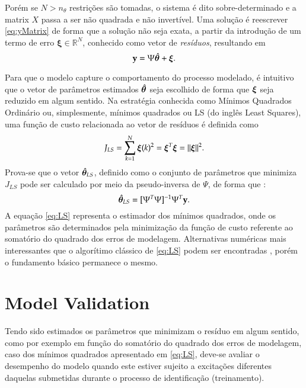 Porém se $N > n_\theta$ restrições são tomadas, o sistema é dito sobre-determinado e a matrix $X$ passa a ser não quadrada e não invertível. Uma solução é reescrever \eqref{eq:yMatrix} de forma que a solução não seja exata, a partir da introdução de um termo de erro $\bm{\xi} \in \mathbb{R}^N$, conhecido como vetor de \emph{resíduos}, resultando em
\begin{equation} 
   \label{eq:ysobredet}
   \mathrm{\mathbf{y}} =  \Psi\hat{\bm{\theta}} + \bm{\xi}.
\end{equation}

Para que o modelo capture o comportamento do processo modelado, é intuitivo que o vetor de parâmetros estimados $\hat{\bm{\theta}}$ seja escolhido de forma que $\bm{\xi}$ seja reduzido em algum sentido. Na estratégia conhecida como Mínimos Quadrados Ordinário ou, simplesmente, mínimos quadrados ou LS (do inglês Least Squares), uma função de custo relacionada ao vetor de resíduos é definida como
\begin{equation}
   \label{eq:JLS}
   J_{LS} = \sum_{k=1}^{N} \bm{\xi}(k)^2 = \bm{\xi}^T\bm{\xi} = ||\bm{\xi}||^2.
\end{equation}
Prova-se que o vetor $\hat{\bm{\theta}}_{LS}$, definido como o conjunto de parâmetros que minimiza $J_{LS}$ pode ser calculado por meio da pseudo-inversa de $\Psi$, de forma que \citep{aguirre2015}:
\begin{equation}
   \hat{\bm{\theta}}_{LS} = [\Psi^T \Psi]^{-1}\Psi^T \mathrm{\mathbf{y}}.
   \label{eq:LS}
\end{equation}
A equação \eqref{eq:LS} representa o estimador dos mínimos quadrados, onde os parâmetros são determinados pela minimização da função de custo referente ao somatório do quadrado dos erros de modelagem.
Alternativas numéricas mais interessantes que o algorítimo clássico de \eqref{eq:LS} podem ser encontradas \citep{aguirre2015,ljung1999}, porém o fundamento básico permanece o mesmo.


\section{Model Validation}\label{sec:model_validation}

Tendo sido estimados os parâmetros que minimizam o resíduo em algum sentido, como por exemplo em função do somatório do quadrado dos erros de modelagem, caso dos mínimos quadrados apresentado em \eqref{eq:LS}, deve-se avaliar o desempenho do modelo quando este estiver sujeito a excitações diferentes daquelas submetidas durante o processo de identificação (treinamento). 

